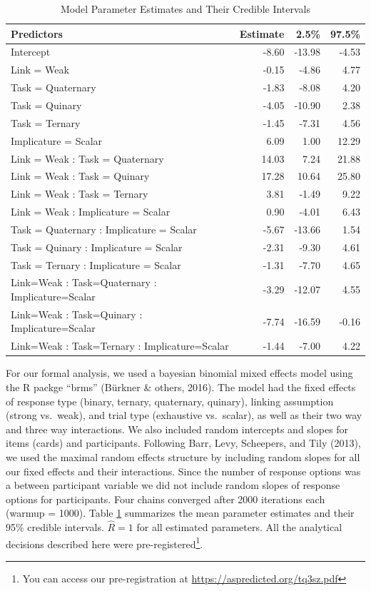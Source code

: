 \documentclass[floatsintext,man]{apa6}
\theoremstyle{definition}
\theoremstyle{definition}
\theoremstyle{definition}
\theoremstyle{remark}
\begin{document}
\begin{table}

\caption{\label{tab:implicatureRate}\label{tab:modeltable}Model Parameter Estimates and Their Credible Intervals}
\centering
\begin{tabular}[t]{lrrr}
\toprule
Predictors & Estimate & 2.5\% & 97.5\%\\
\midrule
Intercept & -8.60 & -13.98 & -4.53\\
Link = Weak & -0.15 & -4.86 & 4.77\\
Task = Quaternary & -1.83 & -8.08 & 4.20\\
Task = Quinary & -4.05 & -10.90 & 2.38\\
Task = Ternary & -1.45 & -7.31 & 4.56\\
\addlinespace
Implicature = Scalar & 6.09 & 1.00 & 12.29\\
Link = Weak : Task = Quaternary & 14.03 & 7.24 & 21.88\\
Link = Weak : Task = Quinary & 17.28 & 10.64 & 25.80\\
Link = Weak : Task = Ternary & 3.81 & -1.49 & 9.22\\
Link = Weak : Implicature = Scalar & 0.90 & -4.01 & 6.43\\
\addlinespace
Task = Quaternary : Implicature = Scalar & -5.67 & -13.66 & 1.54\\
Task = Quinary : Implicature = Scalar & -2.31 & -9.30 & 4.61\\
Task = Ternary : Implicature = Scalar & -1.31 & -7.70 & 4.65\\
Link=Weak : Task=Quaternary : Implicature=Scalar & -3.29 & -12.07 & 4.55\\
Link=Weak : Task=Quinary : Implicature=Scalar & -7.74 & -16.59 & -0.16\\
Link=Weak : Task=Ternary : Implicature=Scalar & -1.44 & -7.00 & 4.22\\
\bottomrule
\end{tabular}
\end{table}

For our formal analysis, we used a bayesian binomial mixed effects model
using the R packge \enquote{brms} (Bürkner \& others, 2016). The model
had the fixed effects of response type (binary, ternary, quaternary,
quinary), linking assumption (strong vs.~weak), and trial type
(exhaustive vs.~scalar), as well as their two way and three way
interactions. We also included random intercepts and slopes for items
(cards) and participants. Following Barr, Levy, Scheepers, and Tily
(2013), we used the maximal random effects structure by including random
slopes for all our fixed effects and their interactions. Since the
number of response options was a between participant variable we did not
include random slopes of response options for participants. Four chains
converged after 2000 iterations each (warmup = 1000). Table
\ref{tab:modeltable} summarizes the mean parameter estimates and their
95\% credible intervals. \(\hat{R}=1\) for all estimated parameters. All
the analytical decisions described here were pre-registered\footnote{You
  can access our pre-registration at
  \url{https://aspredicted.org/tq3sz.pdf}}.
\end{document}
